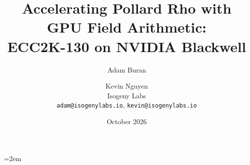 \documentclass[11pt,a4paper]{article}
\title{Accelerating Pollard Rho with GPU Field Arithmetic:\\
       ECC2K-130 on NVIDIA Blackwell}
\author{Adam Buran \and Kevin Nguyen \\
        Isogeny Labs \\
        \texttt{adam@isogenylabs.io}, \texttt{kevin@isogenylabs.io}}
\date{October 2026}
\theoremstyle{definition}
\begin{document}
\maketitle
\emergencystretch=2em

\begin{abstract}

\end{abstract}

\tableofcontents
\clearpage

























\end{document}
